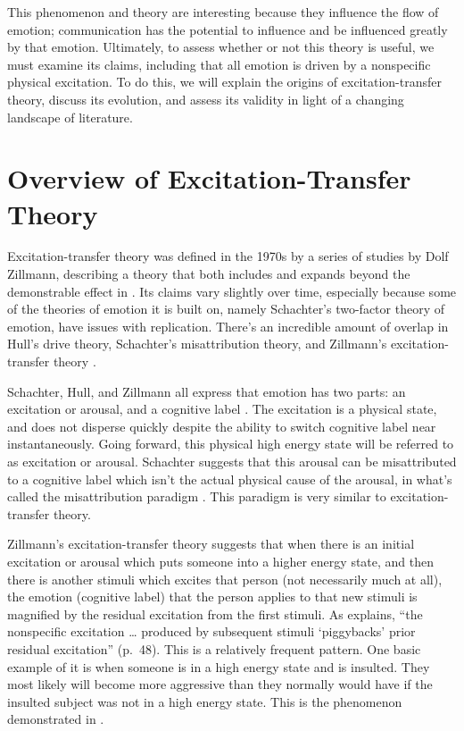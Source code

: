 \documentclass[
  stu,
  12pt]{apa7}
\begin{document}
This phenomenon and theory are interesting because they influence the
flow of emotion; communication has the potential to influence and be
influenced greatly by that emotion. Ultimately, to assess whether or not
this theory is useful, we must examine its claims, including that all
emotion is driven by a nonspecific physical excitation. To do this, we
will explain the origins of excitation-transfer theory, discuss its
evolution, and assess its validity in light of a changing landscape of
literature.

\hypertarget{overview-of-excitation-transfer-theory}{%
\section{Overview of Excitation-Transfer
Theory}\label{overview-of-excitation-transfer-theory}}

Excitation-transfer theory was defined in the 1970s by a series of
studies by Dolf Zillmann, describing a theory that both includes and
expands beyond the demonstrable effect in
\textcite{zilEffectResidualExcitation}. Its claims vary slightly over
time, especially because some of the theories of emotion it is built on,
namely Schachter's two-factor theory of emotion, have issues with
replication. There's an incredible amount of overlap in Hull's drive
theory, Schachter's misattribution theory, and Zillmann's
excitation-transfer theory
\autocite{bryExcitationTransferTheoryThreeFactor}.

Schachter, Hull, and Zillmann all express that emotion has two parts: an
excitation or arousal, and a cognitive label
\autocite{bryExcitationTransferTheoryThreeFactor}. The excitation is a
physical state, and does not disperse quickly despite the ability to
switch cognitive label near instantaneously. Going forward, this
physical high energy state will be referred to as excitation or arousal.
Schachter suggests that this arousal can be misattributed to a cognitive
label which isn't the actual physical cause of the arousal, in what's
called the misattribution paradigm
\autocite{cotReviewResearchSchachter}. This paradigm is very similar to
excitation-transfer theory.

Zillmann's excitation-transfer theory suggests that when there is an
initial excitation or arousal which puts someone into a higher energy
state, and then there is another stimuli which excites that person (not
necessarily much at all), the emotion (cognitive label) that the person
applies to that new stimuli is magnified by the residual excitation from
the first stimuli. As \textcite{bryExcitationTransferTheoryThreeFactor}
explains, ``the nonspecific excitation \ldots{} produced by subsequent
stimuli `piggybacks' prior residual excitation'' (p.~48). This is a
relatively frequent pattern. One basic example of it is when someone is
in a high energy state and is insulted. They most likely will become
more aggressive than they normally would have if the insulted subject
was not in a high energy state. This is the phenomenon demonstrated in
\textcite{zilEffectResidualExcitation}.
\end{document}

